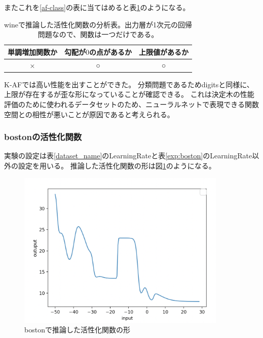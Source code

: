 またこれを\ref{af-class}の表に当てはめると表\ref{anal_wine}のようになる。
\begin{table}[htbp]
    \begin{center}
        \caption{wineで推論した活性化関数の分析表。出力層が1次元の回帰問題なので、関数は一つだけである。}
        \label{anal_wine}
        \vspace{2mm} 
        \begin{tabular}{ |c|c|c| }
        \hline
        単調増加関数か & 勾配が$ 0 $の点があるか & 上限値があるか   \\
        \hline
        × & ○ & ○   \\
        \hline
        \end{tabular}
    \end{center}
\end{table}

K-AFでは高い性能を出すことができた。
分類問題であるためdigitsと同様に、上限が存在するが歪な形になっていることが確認できる。
これは決定木の性能評価のために使われるデータセットのため、ニューラルネットで表現できる関数空間との相性が悪いことが原因であると考えられる。






\subsubsection{bostonの活性化関数}
実験の設定は表\ref{dataset_name}のLearningRateと表\ref{exp:boston}のLearningRate以外の設定を用いる。
推論した活性化関数の形は図\ref{infer_boston}のようになる。
\begin{figure}[hbtp]
    \begin{center}
        \includegraphics[width=10cm]{asset/boston-0.00001.png}
            \caption{bostonで推論した活性化関数の形}
            \label{infer_boston}
    \end{center}
\end{figure}

